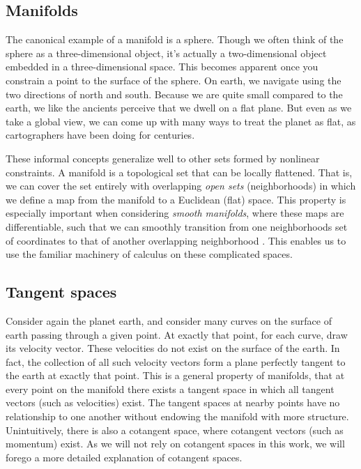 \documentclass[../main.tex]{subfiles}
\begin{document}
\begin{refsection}
\subsection{Manifolds}\label{manifolds}

The canonical example of a manifold is a sphere.
Though we often think of the sphere as a three-dimensional object, it's actually a two-dimensional object embedded in a three-dimensional space.
This becomes apparent once you constrain a point to the surface of the sphere.
On earth, we navigate using the two directions of north and south.
Because we are quite small compared to the earth, we like the ancients perceive that we dwell on a flat plane.
But even as we take a global view, we can come up with many ways to treat the planet as flat, as cartographers have been doing for centuries.

These informal concepts generalize well to other sets formed by nonlinear constraints.
A manifold is a topological set that can be locally flattened.
That is, we can cover the set entirely with overlapping \emph{open sets} (neighborhoods) in which we define a map from the manifold to a Euclidean (flat) space.
This property is especially important when considering \emph{smooth manifolds}, where these maps are differentiable, such that we can smoothly transition from one neighborhoods set of coordinates to that of another overlapping neighborhood \cite{lee_introduction_2003}.
This enables us to use the familiar machinery of calculus on these complicated spaces.

\subsection{Tangent spaces}\label{tangent-spaces}

Consider again the planet earth, and consider many curves on the surface of earth passing through a given point.
At exactly that point, for each curve, draw its velocity vector.
These velocities do not exist on the surface of the earth.
In fact, the collection of all such velocity vectors form a plane perfectly tangent to the earth at exactly that point.
This is a general property of manifolds, that at every point on the manifold there exists a tangent space in which all tangent vectors (such as velocities) exist.
The tangent spaces at nearby points have no relationship to one another without endowing the manifold with more structure.
Unintuitively, there is also a cotangent space, where cotangent vectors (such as momentum) exist.
As we will not rely on cotangent spaces in this work, we will forego a more detailed explanation of cotangent spaces.


\end{refsection}
\end{document}
